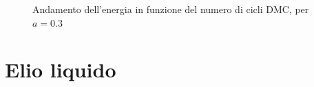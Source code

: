 \documentclass[11pt,a4paper]{article}
\begin{document}
 \begin{figure}[!h]
\centering
{}
\hspace{3mm}
\caption{Andamento dell'energia in funzione del numero di cicli DMC, per $a=0.3$}
\end{figure}

\section{Elio liquido}
\end{document}
